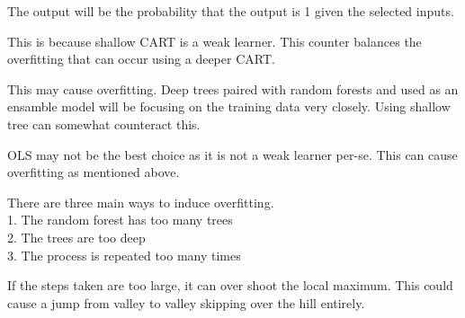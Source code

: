 \documentclass[12pt]{article}
\begin{document}
\begin{enumerate}
The output will be the probability that the output is 1 given the selected inputs. 


This is because shallow CART is a weak learner. This counter balances the overfitting that can occur using a deeper CART. 


This may cause overfitting. Deep trees paired with random forests and used as an ensamble model will be focusing on the training data very closely. Using shallow tree can somewhat counteract this.  


OLS may not be the best choice as it is not a weak learner per-se. This can cause overfitting as mentioned above.


There are three main ways to induce overfitting.
\\1. The random forest has too many trees
\\2. The trees are too deep
\\3. The process is repeated too many times


If the steps taken are too large, it can over shoot the local maximum. This could cause a jump from valley to valley skipping over the hill entirely. 

\end{enumerate}
\end{document}
